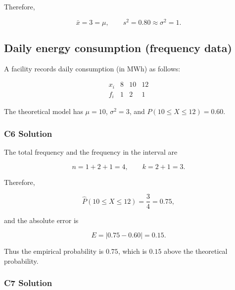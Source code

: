 Therefore,

\[
\boxed{\bar{x}=3=\mu,\qquad s^2=0.80\approx\sigma^2=1.}
\]


\subsection{Daily energy consumption (frequency data)}
\label{sec:c6-probability-frequency}

A facility records daily consumption (in MWh) as follows:

\[
\begin{array}{c|ccc}
	x_i & 8 & 10 & 12 \\ \hline
	f_i & 1 & 2 & 1
\end{array}
\]

The theoretical model has $\mu=10$, $\sigma^2=3$, and
$P(10\leq X\leq12)=0.60$.


\subsubsection*{C6 Solution}
\label{subsec:c6-probability-frequency-b}

The total frequency and the frequency in the interval are

\[
n=1+2+1=4,
\qquad
k=2+1=3.
\]

Therefore,

\[
\widehat P(10\leq X\leq12)=\frac34=0.75,
\]

and the absolute error is

\[
E=|0.75-0.60|=0.15.
\]

Thus the empirical probability is $0.75$, which is $0.15$ above the
theoretical probability.


\subsubsection*{C7 Solution}
\label{subsec:c7-meanvar-frequency-b}


